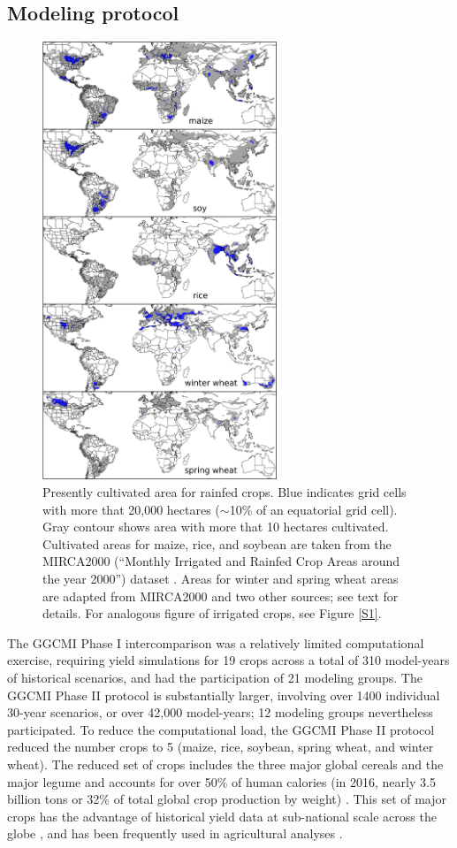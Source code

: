 \documentclass[gmd, manuscript]{copernicus} %
\begin{document}
\subsection{Modeling protocol}
\begin{figure}[ht]
\centering
   \includegraphics[width=7cm]{figures/croparea.png}
   \caption{Presently cultivated area for rainfed crops. Blue indicates grid cells with more that 20,000 hectares ($\sim$10\% of an equatorial grid cell). 
   Gray contour shows area with more that 10 hectares cultivated. Cultivated areas for maize, rice, and soybean are taken from the MIRCA2000 (``Monthly Irrigated and Rainfed Crop Areas around the year 2000'') dataset \citep{Portmann2010}. 
  Areas for winter and spring wheat areas are adapted from MIRCA2000 and two other sources; see text for details.  For analogous figure of irrigated crops, see Figure \ref{S1}.}
   \label{fig:crop_area}
\end{figure}

The GGCMI Phase I intercomparison was a relatively limited computational exercise, requiring yield simulations for 19 crops across a total of 310 model-years of historical scenarios, and had the participation of 21 modeling groups.
The GGCMI Phase II protocol is substantially larger, involving over 1400 individual 30-year scenarios, or over 42,000 model-years; 12 modeling groups nevertheless participated. To reduce the computational load, the GGCMI Phase II protocol reduced the number crops to 5 (maize, rice, soybean, spring wheat, and winter wheat). 
The reduced set of crops includes the three major global cereals and the major legume and accounts for over 50\% of human calories (in 2016, nearly 3.5 billion tons or 32\% of total global crop production by weight) \citep{FAOSTAT}. This set of major crops has the advantage of  historical yield data at sub-national scale across the globe \citep{Ray2012,iizumi_historical_2014}, and has been frequently used in agricultural analyses \citep[e.g.][]{muller_global_2017,porwollik_spatial_2016}.  %
\end{document}

